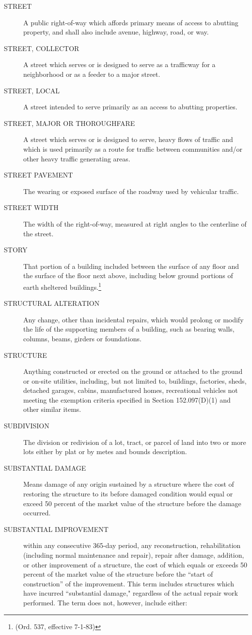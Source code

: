 \begin{description}
\begin{enumerate}[{\indent}1)]
        \end{enumerate}
    \item[STREET] A public right-of-way which affords primary means of access to abutting property, and shall also include avenue, highway, road, or way.
    \item[STREET, COLLECTOR] A street which serves or is designed to serve as a trafficway for a neighborhood or as a feeder to a major street.
    \item[STREET, LOCAL] A street intended to serve primarily as an access to abutting properties.
    \item[STREET, MAJOR OR THOROUGHFARE] A street which serves or is designed to serve, heavy flows of traffic and which is used primarily as a route for traffic between communities and/or other heavy traffic generating areas.
    \item[STREET PAVEMENT]The wearing or exposed surface of the roadway used by vehicular traffic.
    \item[STREET WIDTH] The width of the right-of-way, measured at right angles to the centerline of the street.
    \item[STORY] That portion of a building included between the surface of any floor and the surface of the floor next above, including below ground portions of earth sheltered buildings.\footnote{(Ord. 537, effective 7-1-83)}
    \item[STRUCTURAL ALTERATION] Any change, other than incidental repairs, which would prolong or modify the life of the supporting members of a building, such as bearing walls, columns, beams, girders or foundations.
    \item[STRUCTURE] Anything constructed or erected on the ground or attached to the ground or on-site utilities, including, but not limited to, buildings, factories, sheds, detached garages, cabins, manufactured homes, recreational vehicles not meeting the exemption criteria specified in Section 152.097(D)(1) and other similar items.
    \item[SUBDIVISION] The division or redivision of a lot, tract, or parcel of land into two or more lots either by plat or by metes and bounds description.
    \item[SUBSTANTIAL DAMAGE] Means damage of any origin sustained by a structure where the cost of restoring the structure to its before damaged condition would equal or exceed 50 percent of the market value of the structure before the damage occurred.
    \item[SUBSTANTIAL IMPROVEMENT] within any consecutive 365-day period, any reconstruction, rehabilitation (including normal maintenance and repair), repair after damage, addition, or other improvement of a structure, the cost of which equals or exceeds 50 percent of the market value of the structure before the “start of construction” of the improvement. This term includes structures which have incurred “substantial damage," regardless of the actual repair work performed. The term does not, however, include either:

\end{description}
